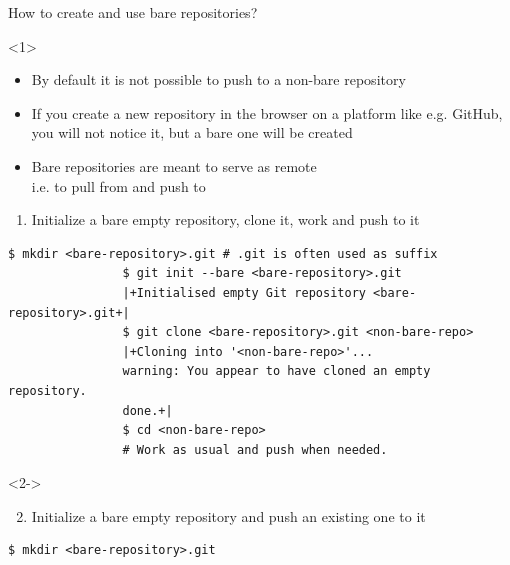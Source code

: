 \documentclass[usenames,svgnames,14pt]{beamer}
\begin{document}
\begin{frame}[fragile]{How to create and use bare repositories?}
    \setlength{\leftmarginii}{8mm}
    \begin{overlayarea}{\textwidth}{0.8\textheight}
        \begin{onlyenv}<1>
            \vspace{1mm}
            \begin{itemize}
                \item By default it is not possible to push to a non-bare repository
                \item If you create a new repository in the browser on a platform like e.g. GitHub, you will not notice it, but a bare one will be created
                \item \alert{Bare repositories are meant} to serve as remote\\ \then i.e. \alert{to pull from and push to}
            \end{itemize}
            \vspace{1mm}
            \begin{enumerate}
                \item Initialize a bare empty repository, clone it, work and push to it
            \end{enumerate}
            \begin{lstlisting}[style=MyBash]
                $ mkdir <bare-repository>.git # .git is often used as suffix
                $ git init --bare <bare-repository>.git
                |+Initialised empty Git repository <bare-repository>.git+|
                $ git clone <bare-repository>.git <non-bare-repo>
                |+Cloning into '<non-bare-repo>'...
                warning: You appear to have cloned an empty repository.
                done.+|
                $ cd <non-bare-repo>
                # Work as usual and push when needed.
            \end{lstlisting}
        \end{onlyenv}
        \begin{onlyenv}<2->
            \begin{enumerate}
                \setcounter{enumi}{1}
                \item Initialize a bare empty repository and push an existing one to it
            \end{enumerate}
            \begin{lstlisting}[style=MyBash]
                $ mkdir <bare-repository>.git

\end{lstlisting}
\end{onlyenv}
\end{overlayarea}
\end{frame}
\end{document}
